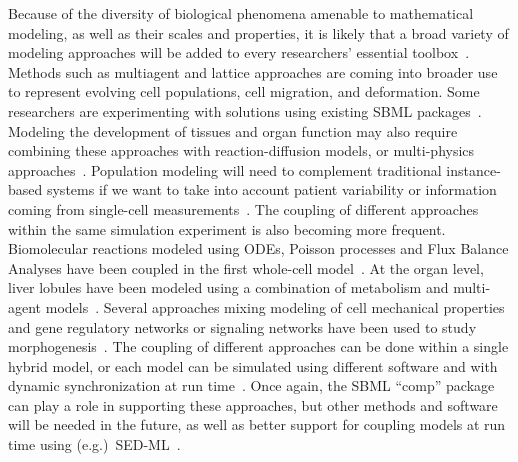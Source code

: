 \documentclass{sbml-paper}
\begin{document}
Because of the diversity of biological phenomena amenable to mathematical modeling, as well as their scales and properties, it is likely that a broad variety of modeling approaches will be added to every researchers' essential toolbox~\citep{Cvijovic2014bridging}.  Methods such as multiagent and lattice approaches are coming into broader use to represent evolving cell populations, cell migration, and deformation.  Some researchers are experimenting with solutions using existing SBML packages~\citep{watanabe2016efficient, varela2018epilog}.  Modeling the development of tissues and organ function may also require combining these approaches with reaction-diffusion models, or multi-physics approaches~\citep{Nickerson2016human}.  Population modeling will need to complement traditional instance-based systems if we want to take into account patient variability or information coming from single-cell measurements~\citep{Levin1997mathematical}.  The coupling of different approaches within the same simulation experiment is also becoming more frequent.  Biomolecular reactions modeled using ODEs, Poisson processes and Flux Balance Analyses have been coupled in the first whole-cell model~\citep{Karr2015principles}.  At the organ level, liver lobules have been modeled using a combination of metabolism and multi-agent models~\citep{schliess2014integrated}.  Several approaches mixing modeling of cell mechanical properties and gene regulatory networks or signaling networks have been used to study morphogenesis~\citep{tanaka2015lbibcell, delile2017cell}.  The coupling of different approaches can be done within a single hybrid model, or each model can be simulated using different software and with dynamic synchronization at run time~\citep{mattioni2013integration}.  Once again, the SBML ``comp'' package can play a role in supporting these approaches, but other methods and software will be needed in the future, as well as better support for coupling models at run time using (e.g.)\ SED-ML~\citep{waltemath2011reproducible}.
\end{document}
